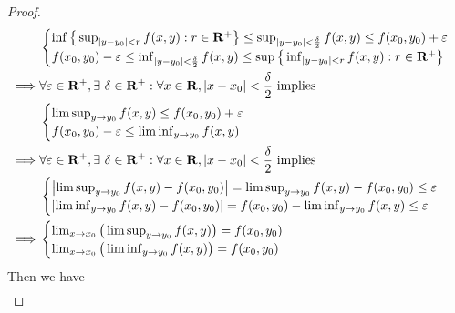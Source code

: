 \begin{proof}
\begin{align*}
                 & \begin{cases}
                       \inf\big\{\sup_{\left\lvert y - y_0\right\rvert < r} f(x, y) : r \in \mathbf{R}^+\big\} \leq \sup_{\left\lvert y - y_0\right\rvert < \frac{\delta}{2}} f(x, y) \leq f(x_0, y_0) + \varepsilon \\
                       f(x_0, y_0) - \varepsilon \leq \inf_{\left\lvert y - y_0\right\rvert < \frac{\delta}{2}} f(x, y) \leq \sup\big\{\inf_{\left\lvert y - y_0\right\rvert < r} f(x, y) : r \in \mathbf{R}^+\big\}
                   \end{cases} \\
        \implies & \forall \varepsilon \in \mathbf{R}^+, \exists\ \delta \in \mathbf{R}^+ : \forall x \in \mathbf{R}, \left\lvert x - x_0\right\rvert < \frac{\delta}{2} \text{ implies}                                                  \\
                 & \begin{cases}
                       \limsup_{y \to y_0} f(x, y) \leq f(x_0, y_0) + \varepsilon \\
                       f(x_0, y_0) - \varepsilon \leq \liminf_{y \to y_0} f(x, y)
                   \end{cases}                                                                                                                   \\
        \implies & \forall \varepsilon \in \mathbf{R}^+, \exists\ \delta \in \mathbf{R}^+ : \forall x \in \mathbf{R}, \left\lvert x - x_0\right\rvert < \frac{\delta}{2} \text{ implies}                                                  \\
                 & \begin{cases}
                       \left\lvert\limsup_{y \to y_0} f(x, y) - f(x_0, y_0)\right\rvert = \limsup_{y \to y_0} f(x, y) - f(x_0, y_0) \leq \varepsilon \\
                       \left\lvert\liminf_{y \to y_0} f(x, y) - f(x_0, y_0)\right\rvert = f(x_0, y_0) - \liminf_{y \to y_0} f(x, y) \leq \varepsilon
                   \end{cases}                                                             \\
        \implies & \begin{cases}
                       \lim_{x \to x_0} \big(\limsup_{y \to y_0} f(x, y)\big) = f(x_0, y_0) \\
                       \lim_{x \to x_0} \big(\liminf_{y \to y_0} f(x, y)\big) = f(x_0, y_0)
                   \end{cases}
    \end{align*}
    Then we have
    \begin{align*}

\end{align*}
\end{proof}
